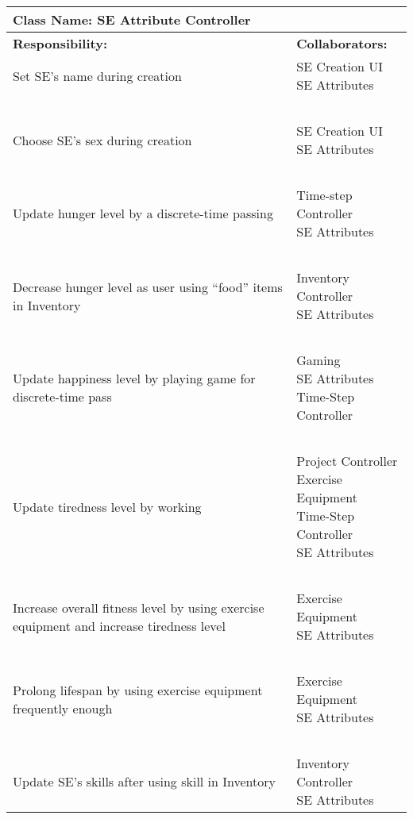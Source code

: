 \documentclass[]{article}
\begin{document}
\begin{table}[H]
    \centering
    \begin{tabular}{|p{5cm}|p{5cm}|}
        \hline
        \multicolumn{2}{|l|}{\textbf{Class Name:} SE Attribute Controller}\\
        \hline
        \textbf{Responsibility:} & \textbf{Collaborators:}\\
        \hline
        Set SE’s name during creation & \makecell[l]{SE Creation UI\\SE Attributes}\\
        ~ & ~\\
        Choose SE’s sex during creation & \makecell[l]{SE Creation UI\\SE Attributes}\\
        ~ & ~\\
        Update hunger level by a discrete-time passing & \makecell[l]{Time-step Controller\\SE Attributes}\\
        ~ & ~\\
        Decrease hunger level as user using “food” items in Inventory & \makecell[l]{Inventory Controller\\SE Attributes}\\
        ~ & ~\\
        Update happiness level by playing game for discrete-time pass & \makecell[l]{Gaming\\SE Attributes\\Time-Step Controller}\\
        ~ & ~\\
        Update tiredness level by working & \makecell[l]{Project Controller\\Exercise Equipment\\Time-Step Controller\\SE Attributes}\\
        ~ & ~\\
        Increase overall fitness level by using exercise equipment and increase tiredness level & \makecell[l]{Exercise Equipment\\SE Attributes}\\
        ~ & ~\\
        Prolong lifespan by using exercise equipment frequently enough & \makecell[l]{Exercise Equipment\\SE Attributes}\\
        ~ & ~\\
        Update SE’s skills after using skill in Inventory & \makecell[l]{Inventory Controller\\SE Attributes}\\

\end{tabular}
\end{table}
\end{document}
